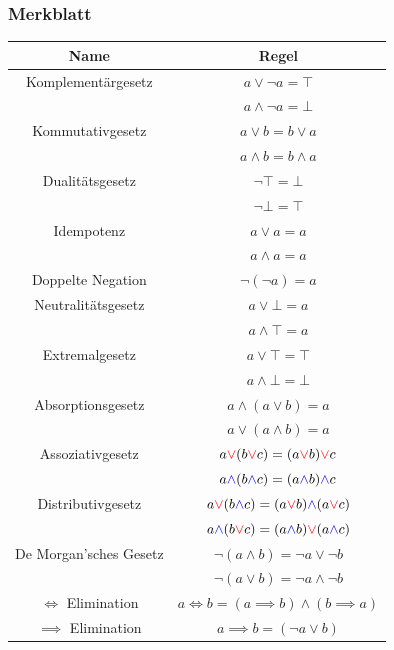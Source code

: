 \documentclass{article}
\begin{document}
		\subsubsection{Merkblatt}
		\begin{tabular}{| c | c |}
			\toprule
			Name & Regel \\ \midrule
			Komplementärgesetz & $a\lor\neg a=\top$ \\
			&$a\land\neg a=\bot$ \\ \hline
			Kommutativgesetz & $a\lor b=b\lor a$\\
			&$a\land b=b\land a$ \\ \hline
			Dualitätsgesetz & $\neg\top=\bot$\\
			&$\neg\bot=\top$ \\ \hline
			Idempotenz & $a\lor a=a$\\
			&$a\land a=a$ \\ \hline
			Doppelte Negation & $\neg(\neg a)=a$ \\ \hline
			Neutralitätsgesetz & $a\lor\bot=a$\\
			&$a\land\top=a$ \\ \hline
			Extremalgesetz & $a\lor\top=\top$\\
			&$a\land\bot=\bot$ \\ \hline
			Absorptionsgesetz & $a\land(a\lor b)=a$ \\
			&$a\lor(a\land b)=a$ \\ \hline
			Assoziativgesetz & $a\textcolor{red}{\lor} (b\textcolor{red}{\lor} c)=(a\textcolor{red}{\lor} b)\textcolor{red}{\lor} c$ \\
			&$a\textcolor{blue}{\land} (b\textcolor{blue}{\land} c)=(a\textcolor{blue}{\land} b)\textcolor{blue}{\land} c$ \\ \hline
			Distributivgesetz & $a\textcolor{red}{\lor} (b\textcolor{blue}{\land} c)=(a\textcolor{red}{\lor} b)\textcolor{blue}{\land} (a\textcolor{red}{\lor} c)$ \\
			&$a\textcolor{blue}{\land} (b\textcolor{red}{\lor} c)=(a\textcolor{blue}{\land} b)\textcolor{red}{\lor} (a\textcolor{blue}{\land} c)$ \\ \hline
			De Morgan'sches Gesetz & $\neg(a\land b)=\neg a\lor\neg b$ \\
			&$\neg(a\lor b)=\neg a\land\neg b$ \\ \hline
			$\iff$ Elimination & $a\iff b=(a\implies b)\land(b\implies a)$ \\ \hline
			$\implies$ Elimination & $a\implies b=(\neg a\lor b)$ \\
			\bottomrule
		\end{tabular} \\
\end{document}
